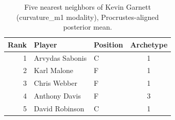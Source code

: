 \begin{table}[htbp]
  \centering\small
  \begin{tabular}{rllc}
    \toprule
    Rank & Player & Position & Archetype \\
    \midrule
    1 & Arvydas Sabonis & C & 1 \\
    2 & Karl Malone & F & 1 \\
    3 & Chris Webber & F & 1 \\
    4 & Anthony Davis & F & 3 \\
    5 & David Robinson & C & 1 \\
    \bottomrule
  \end{tabular}
  \caption{Five nearest neighbors of Kevin Garnett (curvature_m1 modality), Procrustes-aligned posterior mean.}
  \label{tab:Kevin_Garnett_neighbors_curvature_m1}
\end{table}

